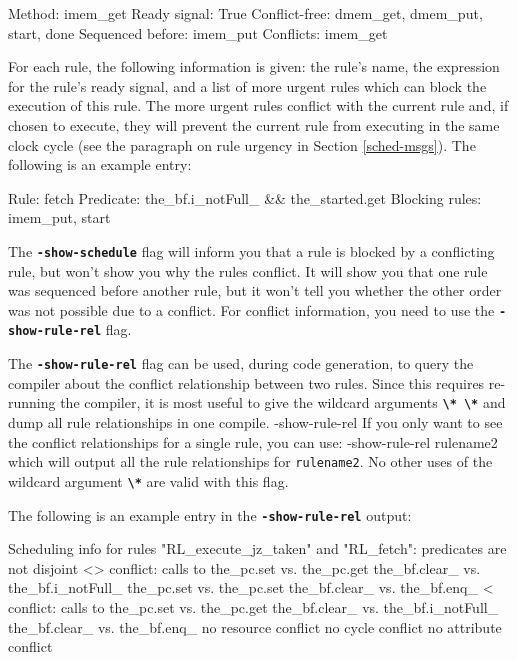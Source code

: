 \documentclass{article}
\newcommand{\te}[1]{\texttt{#1}}
\newenvironment{centerboxverbatim}
  {\center
   \boxedverbatim}
  {\endboxedverbatim
  {\endcenter }}
\begin{document}
\begin{centerboxverbatim}
Method: imem_get
Ready signal: True
Conflict-free: dmem_get, dmem_put, start, done
Sequenced before: imem_put
Conflicts: imem_get
\end{centerboxverbatim}

For each rule, the following information is given: the rule's name,
the expression for the rule's ready signal, and a list of more urgent
rules which can block the execution of this rule.  The more urgent
rules conflict with the current rule and, if chosen to execute, they
will prevent the current rule from executing in the same clock cycle
(see the paragraph on rule urgency in Section \ref{sched-msgs}).
The following is an example entry:

\begin{centerboxverbatim}
Rule: fetch
Predicate: the_bf.i_notFull_ && the_started.get
Blocking rules: imem_put, start
\end{centerboxverbatim}


The {\bf\tt -show-schedule} flag will inform you that a rule is
blocked by a conflicting rule, but won't show you why the rules
conflict.  It will show you that one rule was sequenced before another
rule, but it won't tell you whether the other order was not possible
due to a conflict.  For conflict information, you need to use the
{\bf\tt -show-rule-rel} flag.

The {\bf\tt -show-rule-rel} flag can be used, during code generation,
to query the compiler about the conflict relationship between two
rules.  Since this requires re-running the compiler, it is most useful
to give the wildcard arguments {\bf\tt \verb|\* \*|} and dump all rule
relationships in one compile.
\begin{centerboxverbatim}
-show-rule-rel \* \*
\end{centerboxverbatim}
If you only want to see the conflict relationships for a single rule,
you can use:
\begin{centerboxverbatim}
 -show-rule-rel \* rulename2
\end{centerboxverbatim}
which will output all the rule relationships for \te{rulename2}.  No
other uses of the wildcard argument  {\bf\tt \verb|\*|} are valid with
this flag.

The following is an example entry in the {\bf\tt -show-rule-rel} output:

\begin{centerboxverbatim}
Scheduling info for rules "RL_execute_jz_taken" and "RL_fetch":
predicates are not disjoint
    <>
    conflict:
    calls to
      the_pc.set vs. the_pc.get
      the_bf.clear_ vs. the_bf.i_notFull_
      the_pc.set vs. the_pc.set
      the_bf.clear_ vs. the_bf.enq_
    <
    conflict:
    calls to
      the_pc.set vs. the_pc.get
      the_bf.clear_ vs. the_bf.i_notFull_
      the_bf.clear_ vs. the_bf.enq_
    no resource conflict
    no cycle conflict
    no attribute conflict
\end{centerboxverbatim}
\end{document}
